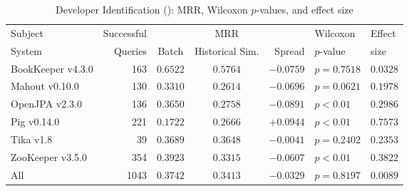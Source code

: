 \begin{table}[t]
\centering
\caption{Developer Identification (\dtwo): MRR, Wilcoxon $p$-values, and effect size}
\begin{tabular}{l|r|ccr|ll}
\toprule
Subject & Successful &    & MRR &        & Wilcoxon  & Effect \\
System  & Queries    & Batch & Historical Sim.  & Spread & $p$-value & size \\
\midrule
BookKeeper v4.3.0 & 163 & $\bm{0.6522}$ & $0.5764$ & $-0.0759$ & $p = 0.7518$ & $0.0328$ \\
Mahout v0.10.0 & 130 & $\bm{0.3310}$ & $0.2614$ & $-0.0696$ & $p = 0.0621$ & $0.1978$ \\
OpenJPA v2.3.0 & 136 & $\bm{0.3650}$ & $0.2758$ & $-0.0891$ & $p < 0.01$ & $0.2986$ \\
Pig v0.14.0 & 221 & $0.1722$ & $\bm{0.2666}$ & $+0.0944$ & $p < 0.01$ & $0.7573$ \\
Tika v1.8 & 39 & $\bm{0.3689}$ & $0.3648$ & $-0.0041$ & $p = 0.2402$ & $0.2353$ \\
ZooKeeper v3.5.0 & 354 & $\bm{0.3923}$ & $0.3315$ & $-0.0607$ & $p < 0.01$ & $0.3822$ \\
\midrule
All & 1043 & $\bm{0.3742}$ & $0.3413$ & $-0.0329$ & $p = 0.8197$ & $0.0089$ \\
\bottomrule
\end{tabular}
\label{table:triage_rq2}
\end{table}
